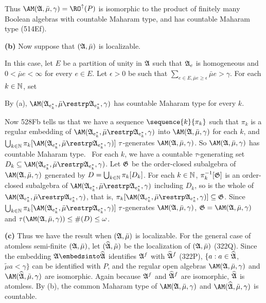 {\medskip

 Thus $\AM(\frak A,\bar\mu,\gamma)=\RO^{\uparrow}(P)$
is isomorphic to the product of finitely many Boolean algebras
with countable Maharam type, and has countable Maharam type (514Ef).

\medskip

{\bf (b)} Now suppose that
$(\frak A,\bar\mu)$ is localizable.

\medskip

 In this case, let $E$ be a partition
of unity in $\frak A$ such that $\frak A_e$ is homogeneous and
$0<\bar\mu e<\infty$ for every $e\in E$.   Let $\epsilon>0$ be such that
$\sum_{e\in E,\bar\mu e\ge\epsilon}\bar\mu e>\gamma$.
For each $k\in\Bbb N$, set


\noindent By (a),
$\AM(\frak A_{e^*_k},\bar\mu\restrp\frak A_{e^*_k},\gamma)$
has countable Maharam type for every $k$.

\medskip

 Now 528Fb tells us that we have a sequence
$\sequence{k}{\pi_k}$ such that
$\pi_k$ is a regular embedding of
$\AM(\frak A_{e^*_k},\bar\mu\restrp\frak A_{e^*_k},\gamma)$ into
$\AM(\frak A,\bar\mu,\gamma)$ for each $k$, and
$\bigcup_{k\in\Bbb N}
\pi_k[\AM(\frak A_{e^*_k},\bar\mu\restrp\frak A_{e^*_k},\gamma)]
\,\,\tau$-generates $\AM(\frak A,\bar\mu,\gamma)$.
So $\AM(\frak A,\bar\mu,\gamma)$ has countable Maharam type.
\Prf\ For each $k$, we have a countable $\tau$-generating set
$D_k\subseteq\AM(\frak A_{e^*_k},\bar\mu\restrp\frak A_{e^*_k},\gamma)$.
Let $\frak G$ be the
order-closed subalgebra of $\AM(\frak A,\bar\mu,\gamma)$ generated by
$D=\bigcup_{k\in\Bbb N}\pi_k[D_k]$.   For each $k\in\Bbb N$,
$\pi_k^{-1}[\frak G]$ is an order-closed subalgebra of
$\AM(\frak A_{e^*_k},\bar\mu\restrp\frak A_{e^*_k},\gamma)$ including
$D_k$, so is the whole of
$\AM(\frak A_{e^*_k},\bar\mu\restrp\frak A_{e^*_k},\gamma)$, that is,
$\pi_k[\AM(\frak A_{e^*_k},\bar\mu\restrp\frak A_{e^*_k},\gamma)]
\subseteq\frak G$.   Since
$\bigcup_{k\in\Bbb N}
\pi_k[\AM(\frak A_{e^*_k},\bar\mu\restrp\frak A_{e^*_k},\gamma)]
\,\,\tau$-generates $\AM(\frak A,\bar\mu,\gamma)$,
$\frak G=\AM(\frak A,\bar\mu,\gamma)$ and
$\tau(\AM(\frak A,\bar\mu,\gamma))\le\#(D)\le\omega$.\ \Qed

\medskip

{\bf (c)} Thus we have the result when $(\frak A,\bar\mu)$ is localizable.
For the general case of atomless semi-finite $(\frak A,\bar\mu)$,
let $(\widehat{\frak A},\tilde\mu)$ be the
localization of $(\frak A,\bar\mu)$ (322Q).
Since the embedding $\frak A\embedsinto\widehat{\frak A}$ identifies
$\frak A^f$ with $\widehat{\frak A}^f$ (322P),
$\{a:a\in\widehat{\frak A}$, $\tilde\mu a<\gamma\}$
can be identified with $P$, and the regular open algebras
$\AM(\frak A,\bar\mu,\gamma)$ and
$\AM(\widehat{\frak A},\tilde\mu,\gamma)$ are isomorphic.   Again because
$\frak A^f$ and $\widehat{\frak A}^f$ are isomorphic, $\widehat{\frak A}$
is atomless.   By (b), the common Maharam type of
$\AM(\frak A,\bar\mu,\gamma)$ and
$\AM(\widehat{\frak A},\tilde\mu,\gamma)$ is countable.
}%

